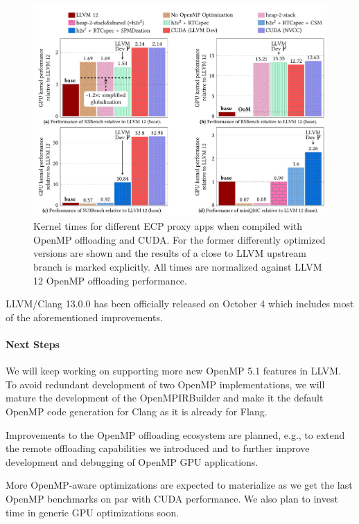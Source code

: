 \begin{figure}[hbt!]
\centering
\includegraphics[width=0.95\linewidth]{projects/2.3.2-Tools/2.3.2.11-SOLLVE/LLVM-Implementation-Figures/LLVM-opt-kernel-times.jpg}
\caption[]{Kernel times for different ECP proxy apps when compiled with OpenMP offloading and CUDA. For the former differently optimized versions are shown and the results of a close to LLVM upstream branch is marked explicitly. All times are normalized against LLVM 12 OpenMP offloading performance.}
\label{fig:kernel_times}
\end{figure}

LLVM/Clang 13.0.0 has been officially released on October 4 which includes most of the aforementioned improvements.


\paragraph{Next Steps}
We will keep working on supporting more new OpenMP 5.1 features in LLVM.
%
To avoid redundant development of two OpenMP implementations, we will mature the development of the OpenMPIRBuilder and make it the default OpenMP code generation for Clang as it is already for Flang.

Improvements to the OpenMP offloading ecosystem are planned, e.g., to extend the remote offloading capabilities we introduced and to further improve development and debugging of OpenMP GPU applications.

More OpenMP-aware optimizations are expected to materialize as we get the last OpenMP benchmarks on par with CUDA performance. We also plan to invest time in generic GPU optimizations soon.
